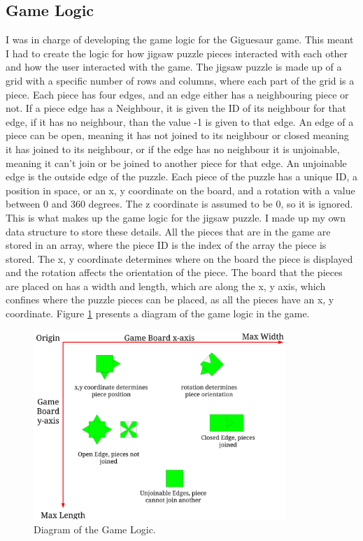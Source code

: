 \documentclass{article}
\begin{document}
\subsection{Game Logic}
I was in charge of developing the game logic for the Giguesaur game. This meant
I had to create the logic for how jigsaw puzzle pieces interacted with each
other and how the user interacted with the game. The jigsaw puzzle is made up of
a grid with a specific number of rows and columns, where each part of the grid
is a piece. Each piece has four edges, and an edge either has a neighbouring
piece or not. If a piece edge has a \gls{Neighbour}, it is given the ID of its
neighbour for that edge, if it has no neighbour, than the value -1 is given to
that edge. An edge of a piece can be open, meaning it has not joined to its
neighbour or closed meaning it has joined to its neighbour, or if the edge has
no neighbour it is unjoinable, meaning it can't join or be joined to another
piece for that edge. An unjoinable edge is the outside edge of the puzzle. Each
piece of the puzzle has a unique ID, a position in space, or an x, y coordinate
on the board, and a rotation with a value between 0 and 360 degrees. The z
coordinate is assumed to be 0, so it is ignored. This is what makes up the game
logic for the jigsaw puzzle. I made up my own data structure to store these
details. All the pieces that are in the game are stored in an array, where the
piece ID is the index of the array the piece is stored. The x, y coordinate
determines where on the board the piece is displayed and the rotation affects
the orientation of the piece. The board that the pieces are placed on has a
width and length, which are along the x, y axis, which confines where the puzzle
pieces can be placed, as all the pieces have an x, y coordinate. Figure
\ref{fig:GameLogic} presents a diagram of the game logic in the game.

\begin{figure}[ht]
\begin{center}
\includegraphics[width=0.85\textwidth, center]{images/GameLogicDiagram}
\caption{Diagram of the Game Logic.}
\label{fig:GameLogic}
\end{center}
\end{figure}
\end{document}
